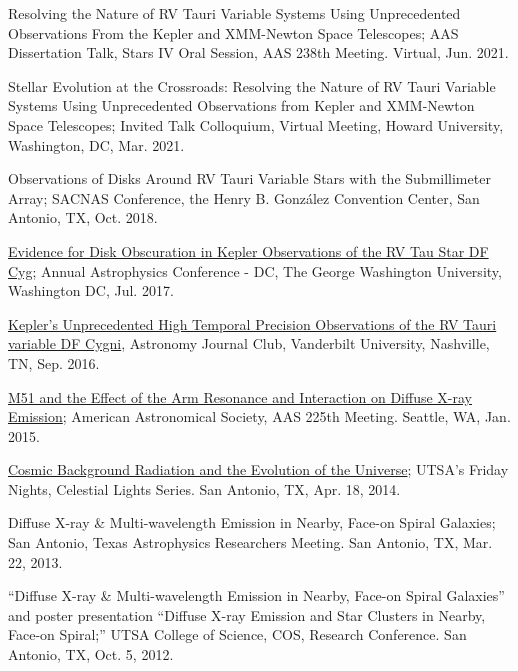 \documentclass[letter,12pt]{article}
\begin{document}
\begin{etaremune}
\item Resolving the Nature of RV Tauri Variable Systems Using Unprecedented Observations From the Kepler and XMM-Newton Space Telescopes; AAS Dissertation Talk, Stars IV Oral Session, AAS 238th Meeting. Virtual, Jun. 2021.

\item Stellar Evolution at the Crossroads: Resolving the Nature of RV Tauri Variable Systems Using Unprecedented Observations from Kepler and XMM-Newton Space Telescopes; Invited Talk Colloquium, Virtual Meeting, Howard University, Washington, DC, Mar. 2021.

\item Observations of Disks Around RV Tauri Variable Stars with the Submillimeter Array; SACNAS Conference, the Henry B. Gonz\'alez Convention Center, San Antonio, TX, Oct. 2018.

\item \href{https://physics.columbian.gwu.edu/sites/g/files/zaxdzs1976/f/downloads/ACDC2017_Agenda_0.pdf}{Evidence for Disk Obscuration in Kepler Observations of the RV Tau Star DF Cyg};  Annual Astrophysics Conference - DC, The George Washington University, Washington DC, Jul. 2017.

\item \href{https://as.vanderbilt.edu/astronomy/2016/08/journal-club-fall-2016/}{Kepler's Unprecedented High Temporal Precision Observations of the RV Tauri variable DF Cygni}, Astronomy Journal Club, Vanderbilt University, Nashville, TN, Sep. 2016.

\item \href{http://adsabs.harvard.edu/abs/2015AAS...22522708V}{M51 and the Effect of the Arm Resonance and Interaction on Diffuse X-ray Emission}; American Astronomical Society, AAS 225th Meeting. Seattle, WA, Jan. 2015.

\item \href{http://www.utsa.edu/today/2014/04/celestiallights4.html}{Cosmic Background Radiation and the Evolution of the Universe}; UTSA’s Friday Nights, Celestial Lights Series. San Antonio, TX, Apr. 18, 2014.

\item Diffuse X-ray \& Multi-wavelength Emission in Nearby, Face-on Spiral Galaxies; San Antonio, Texas Astrophysics Researchers Meeting. San Antonio, TX, Mar. 22, 2013.

\item “Diffuse X-ray \& Multi-wavelength Emission in Nearby, Face-on Spiral Galaxies” and poster presentation “Diffuse X-ray Emission and Star Clusters in Nearby, Face-on Spiral;” UTSA College of Science, COS, Research Conference. San Antonio, TX, Oct. 5, 2012.

\end{etaremune}
\end{document}
